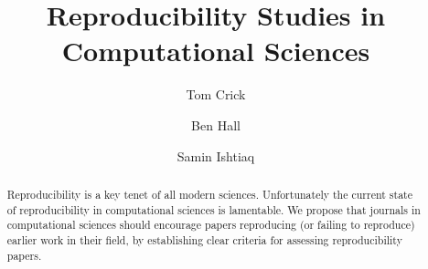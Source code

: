 \documentclass{article}
\begin{document}
%

\title{Reproducibility Studies in Computational Sciences
%
}

%
%
%
%
%
%
\author{
%
%
Tom Crick \and
Ben Hall \and
Samin Ishtiaq
}

\maketitle

\begin{abstract}
Reproducibility is a key tenet of all modern sciences.  Unfortunately
the current state of reproducibility in computational sciences is
lamentable.  We propose that journals in computational sciences should
encourage papers reproducing (or failing to reproduce) earlier work in
their field, by establishing clear criteria for assessing
reproducibility papers.
\end{abstract}
\end{document}
